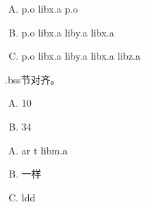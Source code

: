 {    %
    \begin{practicec}
        \begin{enumerate}[A.]
            \item p.o libx.a p.o
            \item p.o libx.a liby.a libx.a
            \item p.o libx.a liby.a libx.a libz.a
        \end{enumerate}
    \end{practicec}

    \begin{practicec}
        .bss节对齐。
    \end{practicec}

    \begin{practicec}
        \begin{enumerate}[A.]
            \item 10
            \item 34
        \end{enumerate}
    \end{practicec}

    \begin{practicec}
        \begin{enumerate}[A.]
            \item ar t libm.a
            \item 一样
            \item ldd
        \end{enumerate}
    \end{practicec}
}
